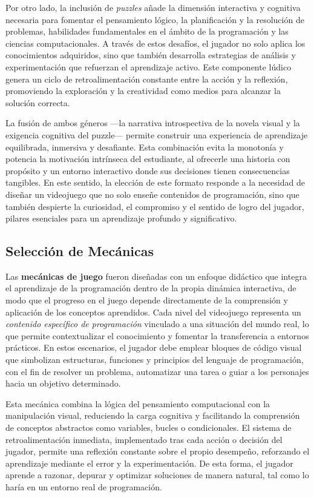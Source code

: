 Por otro lado, la inclusión de \textit{puzzles} añade la dimensión interactiva y cognitiva necesaria para fomentar el pensamiento lógico, la planificación y la resolución de problemas, habilidades fundamentales en el ámbito de la programación y las ciencias computacionales. A través de estos desafíos, el jugador no solo aplica los conocimientos adquiridos, sino que también desarrolla estrategias de análisis y experimentación que refuerzan el aprendizaje activo. Este componente lúdico genera un ciclo de retroalimentación constante entre la acción y la reflexión, promoviendo la exploración y la creatividad como medios para alcanzar la solución correcta.

La fusión de ambos géneros —la narrativa introspectiva de la novela visual y la exigencia cognitiva del puzzle— permite construir una experiencia de aprendizaje equilibrada, inmersiva y desafiante. Esta combinación evita la monotonía y potencia la motivación intrínseca del estudiante, al ofrecerle una historia con propósito y un entorno interactivo donde sus decisiones tienen consecuencias tangibles. En este sentido, la elección de este formato responde a la necesidad de diseñar un videojuego que no solo enseñe contenidos de programación, sino que también despierte la curiosidad, el compromiso y el sentido de logro del jugador, pilares esenciales para un aprendizaje profundo y significativo.


\subsection{Selección de Mecánicas}

Las \textbf{mecánicas de juego} fueron diseñadas con un enfoque didáctico que integra el aprendizaje de la programación dentro de la propia dinámica interactiva, de modo que el progreso en el juego depende directamente de la comprensión y aplicación de los conceptos aprendidos. Cada nivel del videojuego representa un \textit{contenido específico de programación} vinculado a una situación del mundo real, lo que permite contextualizar el conocimiento y fomentar la transferencia a entornos prácticos. En estos escenarios, el jugador debe emplear bloques de código visual que simbolizan estructuras, funciones y principios del lenguaje de programación, con el fin de resolver un problema, automatizar una tarea o guiar a los personajes hacia un objetivo determinado.  

Esta mecánica combina la lógica del pensamiento computacional con la manipulación visual, reduciendo la carga cognitiva y facilitando la comprensión de conceptos abstractos como variables, bucles o condicionales. El sistema de retroalimentación inmediata, implementado tras cada acción o decisión del jugador, permite una reflexión constante sobre el propio desempeño, reforzando el aprendizaje mediante el error y la experimentación. De esta forma, el jugador aprende a razonar, depurar y optimizar soluciones de manera natural, tal como lo haría en un entorno real de programación.  

